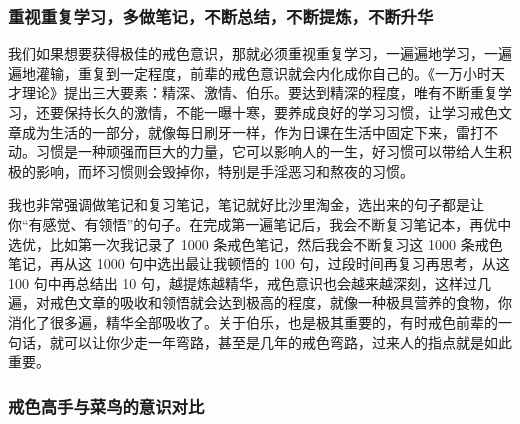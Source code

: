 \documentclass{ctexart}
\begin{document}
\subsubsection{重视重复学习，多做笔记，不断总结，不断提炼，不断升华}

我们如果想要获得极佳的戒色意识，那就必须重视重复学习，一遍遍地学习，一遍遍地灌输，重复到一定程度，前辈的戒色意识就会内化成你自己的。《一万小时天才理论》提出三大要素：精深、激情、伯乐。要达到精深的程度，唯有不断重复学习，还要保持长久的激情，不能一曝十寒，要养成良好的学习习惯，让学习戒色文章成为生活的一部分，就像每日刷牙一样，作为日课在生活中固定下来，雷打不动。习惯是一种顽强而巨大的力量，它可以影响人的一生，好习惯可以带给人生积极的影响，而坏习惯则会毁掉你，特别是手淫恶习和熬夜的习惯。

我也非常强调做笔记和复习笔记，笔记就好比沙里淘金，选出来的句子都是让你“有感觉、有领悟”的句子。在完成第一遍笔记后，我会不断复习笔记本，再优中选优，比如第一次我记录了 1000 条戒色笔记，然后我会不断复习这 1000 条戒色笔记，再从这 1000 句中选出最让我顿悟的 100 句，过段时间再复习再思考，从这 100 句中再总结出 10 句，越提炼越精华，戒色意识也会越来越深刻，这样过几遍，对戒色文章的吸收和领悟就会达到极高的程度，就像一种极具营养的食物，你消化了很多遍，精华全部吸收了。关于伯乐，也是极其重要的，有时戒色前辈的一句话，就可以让你少走一年弯路，甚至是几年的戒色弯路，过来人的指点就是如此重要。

\subsubsection{戒色高手与菜鸟的意识对比}
\end{document}
